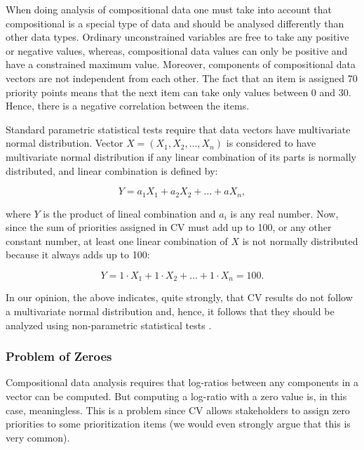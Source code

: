 
When doing analysis of compositional data one must take into account that compositional is a special type of data and should be analysed differently than other data types.
Ordinary unconstrained variables are free to take any positive or negative values,
whereas, compositional data values can only be positive and have a constrained maximum value.
Moreover, components of compositional data vectors are not independent from each other.
The fact that an item is assigned 70 priority points means that the next item can take only values between 0 and 30.
Hence, there is a negative correlation between the items.

Standard parametric statistical tests require that data vectors have multivariate normal distribution.
Vector $X=(X_{1}, X_{2}, \ldots, X_{n})$
is considered to have multivariate normal distribution if any linear
combination of its parts is normally distributed, and linear combination
is defined by:

\begin{equation}
	Y=a_{1}X_{1}+a_{2}X_{2}+\ldots+aX_{n},
\end{equation}

where $Y$ is the product of lineal combination and $a_{i}$ is any
real number. Now, since the sum of priorities assigned in CV must add up
to 100, or any other constant number, at least one linear combination
of $X$ is not normally distributed because it always adds up to
100:

\begin{equation}
	Y=1\cdot X_{1}+1\cdot X_{2}+\ldots+1\cdot X_{n}=100.
\end{equation}

In our opinion, the above indicates, quite strongly, that CV results do not follow a multivariate normal distribution and, hence, it follows that they should be analyzed using non-parametric statistical tests \cite{Pawlowsky-Glahn2006}.

\subsubsection{\label{Problem-of-Zeroes}Problem of Zeroes}
Compositional data analysis requires that log-ratios between any components in a vector can be
computed. But computing a log-ratio with a zero value is, in this case, meaningless. This is
a problem since CV allows stakeholders to assign zero priorities
to some prioritization items (we would even strongly argue that this is very common). 

